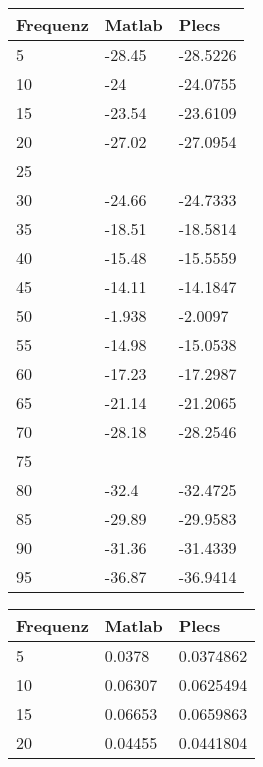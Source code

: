 \begin{appendix}
\begin{minipage}{0.49\textwidth}
	\centering
	\begin{tabular}{|l|l|l|}
		\hline
		Frequenz & Matlab & Plecs    \\ \hline
		5        & -28.45 & -28.5226 \\ \hline
		10       & -24    & -24.0755 \\ \hline
		15       & -23.54 & -23.6109 \\ \hline
		20       & -27.02 & -27.0954 \\ \hline
		25       &        &          \\ \hline
		30       & -24.66 & -24.7333 \\ \hline
		35       & -18.51 & -18.5814 \\ \hline
		40       & -15.48 & -15.5559 \\ \hline
		45       & -14.11 & -14.1847 \\ \hline
		50       & -1.938 & -2.0097  \\ \hline
		55       & -14.98 & -15.0538 \\ \hline
		60       & -17.23 & -17.2987 \\ \hline
		65       & -21.14 & -21.2065 \\ \hline
		70       & -28.18 & -28.2546 \\ \hline
		75       &        &          \\ \hline
		80       & -32.4  & -32.4725 \\ \hline
		85       & -29.89 & -29.9583 \\ \hline
		90       & -31.36 & -31.4339 \\ \hline
		95       & -36.87 & -36.9414 \\ \hline
	\end{tabular}
	\label{tab:abs_Schwing_80_Vergleich}
\end{minipage}
%
\begin{minipage}{0.49\textwidth}
	\begin{tabular}{|l|l|l|}
		\hline
		Frequenz & Matlab  & Plecs     \\ \hline
		5        & 0.0378  & 0.0374862 \\ \hline
		10       & 0.06307 & 0.0625494 \\ \hline
		15       & 0.06653 & 0.0659863 \\ \hline
		20       & 0.04455 & 0.0441804 \\ \hline

\end{tabular}
\end{minipage}
\end{appendix}
